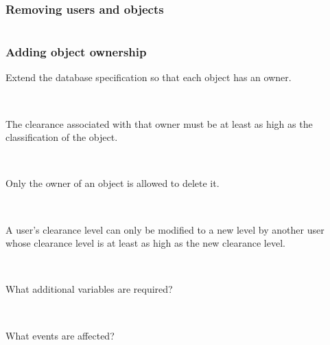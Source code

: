 \documentclass{beamer}
\begin{document}
\begin{frame}

\frametitle{Removing users and objects}

\begin{columns}
\begin{column}{2in}
\end{column}
\begin{column}{2in}
\pause
\end{column}
\end{columns}


\end{frame}





\begin{frame}

\frametitle{Adding object ownership}

Extend the database specification so that each object has an owner.

~

The clearance associated with that owner must be at least as
high as the classification of the object.  

~

Only the owner of an
object is allowed to delete it.

~

A user's clearance level can only be modified to a new level 
by another user whose clearance level is at least as high as the 
new clearance level.

~

What additional variables are required?

~

What events are affected?





\end{frame}
\end{document}

